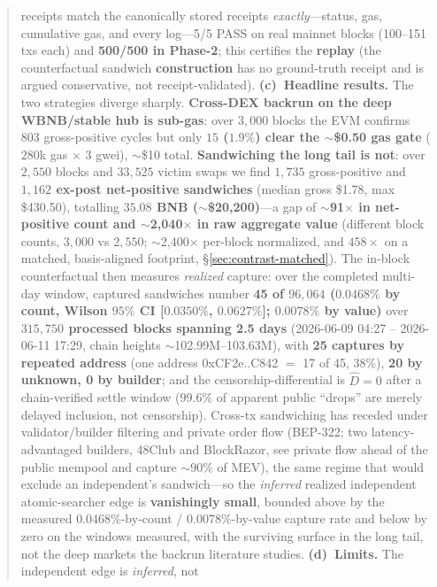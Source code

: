 \documentclass[11pt]{article}
\begin{document}
\begin{abstract}
receipts match the canonically stored receipts \emph{exactly}---status, gas, cumulative
gas, and every log---5/5 PASS on real mainnet blocks (100--151 txs each) and
\textbf{500/500 in Phase-2}; this certifies the \textbf{replay} (the counterfactual
sandwich \textbf{construction} has no ground-truth receipt and is argued conservative,
not receipt-validated). \textbf{(c)~Headline results.} The two strategies diverge
sharply. \textbf{Cross-DEX backrun on the deep WBNB/stable hub is sub-gas}: over
$3{,}000$ blocks the EVM confirms $803$ gross-positive cycles but only \textbf{$15$
($1.9\%$) clear the $\sim$\$0.50 gas gate} ($280$k gas $\times$ $3$ gwei), $\sim$\$10
total. \textbf{Sandwiching the long tail is not}: over $2{,}550$ blocks and $33{,}525$
victim swaps we find $1{,}735$ gross-positive and \textbf{$1{,}162$ ex-post net-positive
sandwiches} (median gross \$1.78, max \$430.50), totalling \textbf{$35.08$ BNB
($\sim$\$20{,}200)}---a gap of \textbf{$\sim$91$\times$ in net-positive count and
$\sim$2{,}040$\times$ in raw aggregate value} (different block counts, $3{,}000$ vs
$2{,}550$; $\sim$2{,}400$\times$ per-block normalized, and $458\times$ on a matched,
basis-aligned footprint, \S\ref{sec:contrast-matched}). The in-block counterfactual then
measures \emph{realized} capture: over the completed multi-day window, captured
sandwiches number \textbf{45 of $96{,}064$ ($0.0468\%$ by count, Wilson $95\%$ CI
[$0.0350\%$, $0.0627\%$]; $0.0078\%$ by value)} over \textbf{$315{,}750$ processed blocks
spanning 2.5 days} (2026-06-09 04:27 -- 2026-06-11 17:29, chain heights
$\sim$102.99M--103.63M), with \textbf{25 captures by repeated address} (one address
0xCF2e..C842 $=$ 17 of 45, $38\%$), \textbf{20 by unknown, 0 by builder}; and the
censorship-differential is \textbf{$\hat D = 0$} after a chain-verified settle window
($99.6\%$ of apparent public ``drops'' are merely delayed inclusion, not censorship).
Cross-tx sandwiching has receded under validator/builder filtering and private order
flow (BEP-322; two latency-advantaged builders, 48Club and BlockRazor, see private flow
ahead of the public mempool and capture $\sim$$90\%$ of MEV), the same regime that would
exclude an independent's sandwich---so the \emph{inferred} realized independent
atomic-searcher edge is \textbf{vanishingly small}, bounded above by the measured
$0.0468\%$-by-count / $0.0078\%$-by-value capture rate and below by zero on the windows
measured, with the surviving surface in the long tail, not the deep markets the backrun
literature studies. \textbf{(d)~Limits.} The independent edge is \emph{inferred}, not
$$
\end{abstract}
\end{document}
